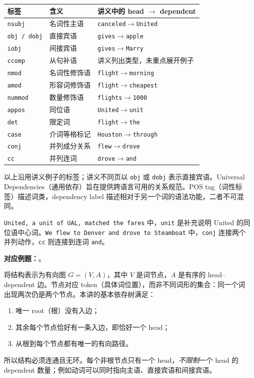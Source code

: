 \begin{center}
\small
\begin{tabularx}{\textwidth}{@{}l l X@{}}
\toprule
标签 & 含义 & 讲义中的 head $\rightarrow$ dependent \\
\midrule
\texttt{nsubj} & 名词性主语 & \texttt{canceled}$\rightarrow$\texttt{United} \\
\texttt{obj / dobj} & 直接宾语 & \texttt{gives}$\rightarrow$\texttt{apple} \\
\texttt{iobj} & 间接宾语 & \texttt{gives}$\rightarrow$\texttt{Marry} \\
\texttt{ccomp} & 从句补语 & 讲义列出类型，未重点展开例子 \\
\texttt{nmod} & 名词性修饰语 & \texttt{flight}$\rightarrow$\texttt{morning} \\
\texttt{amod} & 形容词修饰语 & \texttt{flight}$\rightarrow$\texttt{cheapest} \\
\texttt{nummod} & 数量修饰语 & \texttt{flights}$\rightarrow$\texttt{1000} \\
\texttt{appos} & 同位语 & \texttt{United}$\rightarrow$\texttt{unit} \\
\texttt{det} & 限定词 & \texttt{flight}$\rightarrow$\texttt{the} \\
\texttt{case} & 介词等格标记 & \texttt{Houston}$\rightarrow$\texttt{through} \\
\texttt{conj} & 并列成分关系 & \texttt{flew}$\rightarrow$\texttt{drove} \\
\texttt{cc} & 并列连词 & \texttt{drove}$\rightarrow$\texttt{and} \\
\bottomrule
\end{tabularx}
\end{center}

以上沿用讲义例子的标签；讲义不同页以 \texttt{obj} 或 \texttt{dobj} 表示直接宾语。Universal Dependencies（通用依存）旨在提供跨语言可用的关系规范。POS tag（词性标签）描述词类，dependency label 描述相对于另一个词的语法功能，二者不可混同。

\texttt{United, a unit of UAL, matched the fares} 中，\texttt{unit} 是补充说明 United 的同位语中心词。\texttt{We flew to Denver and drove to Steamboat} 中，\texttt{conj} 连接两个并列动作，\texttt{cc} 则连接到连词 \texttt{and}。

\textbf{对应例题：}。


将结构表示为有向图 $G=(V,A)$，其中 $V$ 是词节点，$A$ 是有序的 head--dependent 边。节点对应 token（具体词位置），而非不同词形的集合：同一个词出现两次仍是两个节点。本讲的基本依存树满足：
\begin{enumerate}
  \item 唯一 root（根）没有入边；
  \item 其余每个节点恰好有一条入边，即恰好一个 head；
  \item 从根到每个节点都有唯一的有向路径。
\end{enumerate}
所以结构必须连通且无环。每个非根节点只有一个 head，\emph{不限制}一个 head 的 dependent 数量；例如动词可以同时指向主语、直接宾语和间接宾语。

